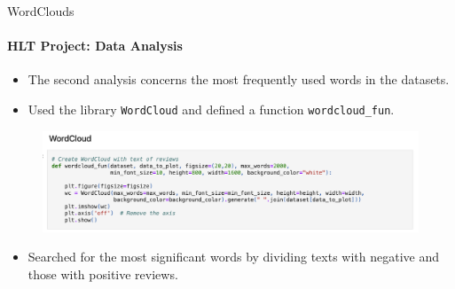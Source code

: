 \documentclass{beamer}
\theoremstyle{definition}
\theoremstyle{plain}
\begin{document}
\begin{frame}{WordClouds}
\framesubtitle{HLT Project: Data Analysis}
{\small 

\begin{itemize}
    \item The second analysis concerns the most frequently used words in the datasets.
    \item Used the library \texttt{WordCloud} and defined a function \texttt{wordcloud\_fun}.
\end{itemize}

\begin{figure}
    \centering
    \includegraphics[scale=0.4]{Figures/wordcloud_fun.png}
\end{figure}

\begin{itemize}
    \item Searched for the most significant words by dividing texts with negative and those with positive reviews.
\end{itemize}

}
\end{frame}
\end{document}

